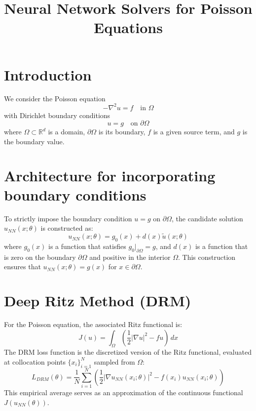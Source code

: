 \documentclass{article}
\title{Neural Network Solvers for Poisson Equations}
\author{}
\date{}
\begin{document}
\maketitle

\section{Introduction}
We consider the Poisson equation 
$$-\nabla^2 u = f \quad \text{in } \Omega$$
with Dirichlet boundary conditions 
$$u = g \quad \text{on } \partial \Omega$$
where $\Omega \subset \mathbb{R}^d$ is a domain, $\partial \Omega$ is its boundary, $f$ is a given source term, and $g$ is the boundary value.

\section{Architecture for incorporating boundary conditions}
To strictly impose the boundary condition $u = g$ on $\partial \Omega$, the candidate solution $u_{NN}(x; \theta)$ is constructed as:
$$u_{NN}(x; \theta) = g_0(x) + d(x) \tilde{u}(x; \theta)$$
where $g_0(x)$ is a function that satisfies $g_0|_{\partial\Omega} = g$, and $d(x)$ is a function that is zero on the boundary $\partial\Omega$ and positive in the interior $\Omega$. This construction ensures that $u_{NN}(x; \theta) = g(x)$ for $x \in \partial \Omega$.

\section{Deep Ritz Method (DRM)}

For the Poisson equation, the associated Ritz functional is:
$$J(u) = \int_{\Omega} \left( \frac{1}{2} |\nabla u|^2 - fu \right) \, dx$$
The DRM loss function is the discretized version of the Ritz functional, evaluated at collocation points $\{x_i\}_{i=1}^N$ sampled from $\Omega$:
$$L_{DRM}(\theta) = \frac{1}{N} \sum_{i=1}^N \left( \frac{1}{2} |\nabla u_{NN}(x_i; \theta)|^2 - f(x_i) u_{NN}(x_i; \theta) \right)$$
This empirical average serves as an approximation of the continuous functional $J(u_{NN}(\theta))$. 
\end{document}
